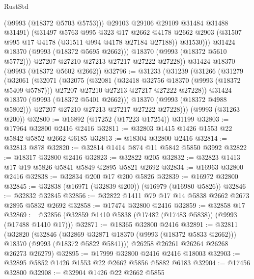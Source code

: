 \begin{lexlean}{RustStd}
\begin{coremodule}
                    (@9993 (@18372 @5703 @5753)))
                  @29103
                  @29106
                  @29109
                  @31484
                  @31488
                  @31491)
                (@31497
                  @5763
                  @995
                  @323
                  @17
                  @2662
                  @4178
                  @2662
                  @2903
                  (@31507 @995 @17 @4178 (@31511 @994 @4178 @27184 @27188))
                  @31530)))
            @31424
            @18370
            (@9993 (@18372 @5695 @2662)))
          @18370
          (@9993 (@18372 @5610 @5772)))
        @27207
        @27210
        @27213
        @27217
        @27222
        @27228))
    @31424
    @18370
    (@9993 (@18372 @5602 @2662))
@32796 := @31233
    (@31239
      (@31266
        (@31279
          (@32061
            (@32071
              (@32075
                (@32081
                  (@32418 @32756 @18370 (@9993 (@18372 @5409 @5787)))
                  @27207
                  @27210
                  @27213
                  @27217
                  @27222
                  @27228))
              @31424
              @18370
              (@9993 (@18372 @5401 @2662)))
            @18370
            (@9993 (@18372 @4988 @5802)))
          @27207
          @27210
          @27213
          @27217
          @27222
          @27228)))
    (@9993 (@31263 @200))
@32800 := @16892 (@17252 (@17223 @17254)) @31199
@32803 := @17964 @32800 @2416 @2416
@32811 := @32803 @1415 @1426 @1553 @22 @5842 @5852 @2662 @6185
@32813 := @18304 @32800 @2416
@32814 := @32813 @878
@32820 := @32814 @1414 @874 @11 @5842 @5850 @3992
@32822 := @18317 @32800 @2416
@32823 := @32822 @205
@32832 := @32823 @1413 @17 @19 @5826 @5841 @5849 @2895 @5821 @2692
@32834 := @16963 @32800 @2416
@32838 := @32834 @200 @17 @200 @5826
@32839 := @16972 @32800
@32845 := @32838 (@16971 (@32839 @200)) (@16979 (@16980 @5826))
@32846 := @32832 @32845
@32856 := @32822 @1411 @79 @17 @14 @5838 @2662 @2673 @2895 @5832 @2692
@32858 := @17474 @32800 @2416
@32859 := @32858 @17
@32869 := @32856 (@32859 @1410 @5838 (@17482 (@17483 @5838)) (@9993 (@17488 @1410 @17)))
@32871 := @18365 @32800 @2416
@32891 := @32811
    (@32820
      (@32846
        (@32869 @32871 @18370 (@9993 (@18372 @5833 @2662)))
        @18370
        (@9993 (@18372 @5822 @5841)))
      @26258
      @26261
      @26264
      @26268
      @26273
      @26279)
@32895 := @17999 @32800 @2416 @2416 @18003
@32903 := @32895 @5852 @1426 @1553 @22 @2662 @5856 @5882 @6183
@32904 := @17456 @32800
@32908 := @32904 @1426 @22 @2662 @5855

\end{coremodule}
\end{lexlean}
